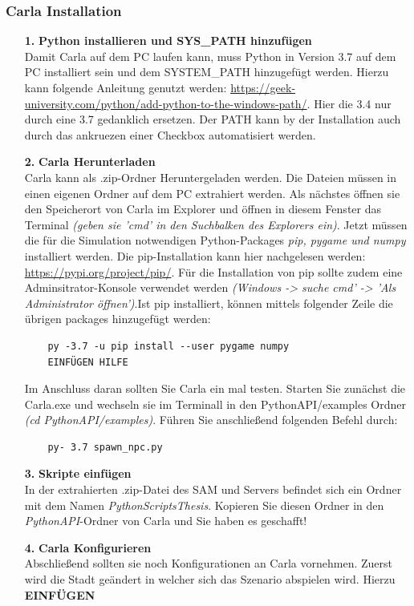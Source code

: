 \subsubsection{Carla Installation}
\begin{itemize}
	\item[\textbf{1.}] \textbf{Python installieren und SYS\_PATH hinzufügen}\\
	Damit Carla auf dem PC laufen kann, muss Python in Version 3.7 auf dem PC installiert sein und dem SYSTEM\_PATH hinzugefügt werden. Hierzu kann folgende Anleitung genutzt werden: \url{https://geek-university.com/python/add-python-to-the-windows-path/}. Hier die 3.4 nur durch eine 3.7 gedanklich ersetzen. Der PATH kann by der Installation auch durch das ankruezen einer Checkbox automatisiert werden.
	
	\item[\textbf{2.}] \textbf{Carla Herunterladen}\\
	Carla kann als .zip-Ordner Heruntergeladen werden. Die Dateien müssen in einen eigenen Ordner auf dem PC extrahiert werden. Als nächstes öffnen sie den Speicherort von Carla im Explorer und öffnen in diesem Fenster das Terminal \textit{(geben sie 'cmd' in den Suchbalken des Explorers ein)}. Jetzt müssen die für die Simulation notwendigen  Python-Packages \textit{pip, pygame und numpy} installiert werden. Die pip-Installation kann hier nachgelesen werden: \url{https://pypi.org/project/pip/}. Für die Installation von pip sollte zudem eine Adminsitrator-Konsole verwendet werden \textit{(Windows -> suche cmd' -> 'Als Administrator öffnen')}.Ist pip installiert, können mittels folgender Zeile die übrigen packages hinzugefügt werden:
	\begin{verbatim}
	py -3.7 -u pip install --user pygame numpy 
	EINFÜGEN HILFE
	\end{verbatim}
	Im Anschluss daran sollten Sie Carla ein mal testen. Starten Sie zunächst die Carla.exe und wechseln sie im Terminall in den PythonAPI/examples Ordner \textit{(cd PythonAPI/examples)}. Führen Sie anschließend folgenden Befehl durch:
	\begin{verbatim}
	py- 3.7 spawn_npc.py
	\end{verbatim}
	\item[\textbf{3.}] \textbf{Skripte einfügen}\\
	In der extrahierten .zip-Datei des SAM und Servers befindet sich ein Ordner mit dem Namen \textit{PythonScriptsThesis}. Kopieren Sie diesen Ordner in den \textit{PythonAPI}-Ordner von Carla und Sie haben es geschafft! 
	\item[\textbf{4.}] \textbf{Carla Konfigurieren}\\
	Abschließend sollten sie noch Konfigurationen an Carla vornehmen. Zuerst wird die Stadt geändert in welcher sich das Szenario abspielen wird. Hierzu\\
	\textbf{EINFÜGEN}\\
	

\end{itemize}
